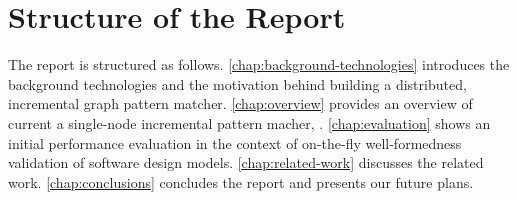 \section{Structure of the Report}
 
The report is structured as follows. 
\autoref{chap:background-technologies} introduces the background technologies and the motivation behind building a distributed, incremental graph pattern matcher. \autoref{chap:overview} provides an overview of current a single-node incremental pattern macher, \eiq{}. 
\autoref{chap:evaluation} shows an initial performance evaluation in the context of on-the-fly well-formedness validation of software design models. 
\autoref{chap:related-work} discusses the related work. \autoref{chap:conclusions} concludes the report and presents our future plans. 

